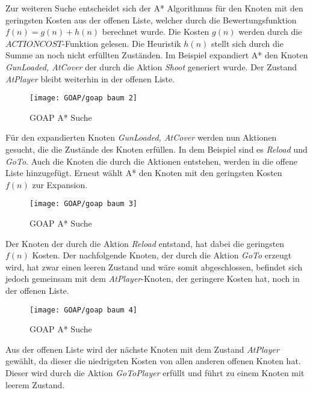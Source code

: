 Zur weiteren Suche entscheidet sich der A* Algorithmus für den Knoten mit den geringsten Kosten aus der offenen Liste, welcher durch die Bewertungsfunktion $f(n) = g(n) + h(n)$ berechnet wurde. Die Kosten $g(n)$ werden durch die $ACTIONCOST$-Funktion gelesen. Die Heuristik $h(n)$ stellt sich durch die Summe an noch nicht erfüllten Zuständen. Im Beispiel expandiert A* den Knoten \textit{GunLoaded, AtCover} der durch die Aktion \textit{Shoot} generiert wurde. Der Zustand \textit{AtPlayer} bleibt weiterhin in der offenen Liste.

\begin{figure}[h]
  \centering
  \texttt{[image: GOAP/goap baum 2]}
	\captionsetup{justification=justified, format=plain}
  \caption{GOAP A* Suche}
  \label{fig:goap2}
\end{figure}

Für den expandierten Knoten \textit{GunLoaded, AtCover} werden nun Aktionen gesucht, die die Zustände des Knoten erfüllen. In dem Beispiel sind es \textit{Reload} und \textit{GoTo}. Auch die Knoten die durch die Aktionen entstehen, werden in die offene Liste hinzugefügt. Erneut wählt A* den Knoten mit den geringsten Kosten $f(n)$ zur Expansion.
\clearpage

\begin{figure}[h]
  \centering
  \texttt{[image: GOAP/goap baum 3]}
	\captionsetup{justification=justified, format=plain}
  \caption{GOAP A* Suche}
  \label{fig:goap3}
\end{figure}

Der Knoten der durch die Aktion \textit{Reload} entstand, hat dabei die geringsten $f(n)$ Kosten. Der nachfolgende Knoten, der durch die Aktion \textit{GoTo} erzeugt wird, hat zwar einen leeren Zustand und wäre somit abgeschlossen, befindet sich jedoch gemeinsam mit dem \textit{AtPlayer}-Knoten, der geringere Kosten hat, noch in der offenen Liste.

\begin{figure}[h]
  \centering
  \texttt{[image: GOAP/goap baum 4]}
	\captionsetup{justification=justified, format=plain}
  \caption{GOAP A* Suche}
  \label{fig:goap4}
\end{figure}

Aus der offenen Liste wird der nächste Knoten mit dem Zustand \textit{AtPlayer} gewählt, da dieser die niedrigsten Kosten von allen anderen offenen Knoten hat. Dieser wird durch die Aktion \textit{GoToPlayer} erfüllt und führt zu einem Knoten mit leerem Zustand.

